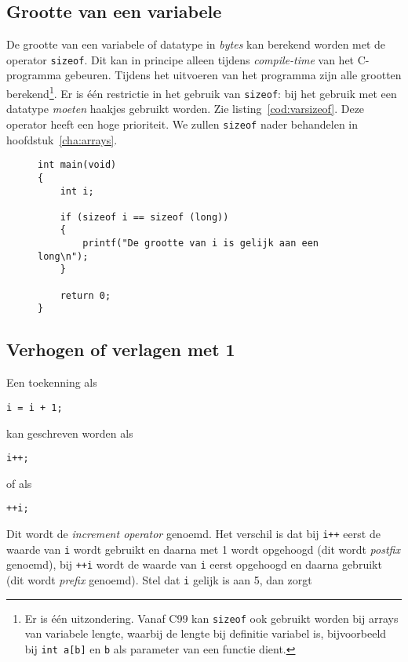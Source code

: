 \subsection{Grootte van een variabele}
De grootte van een variabele of datatype in \textsl{bytes} kan berekend worden met de operator \mbox{\texttt{sizeof}}. Dit kan in principe alleen tijdens \textsl{compile-time} van het C-programma gebeuren. Tijdens het uitvoeren van het programma zijn alle grootten berekend\footnote{Er is één uitzondering. Vanaf C99 kan \texttt{sizeof} ook gebruikt worden bij arrays van variabele lengte, waarbij de lengte bij definitie variabel is, bijvoorbeeld bij \texttt{int a[b]} en \texttt{b} als parameter van een functie dient.}. Er is één restrictie in het gebruik van \texttt{sizeof}: bij het gebruik met een datatype \textsl{moeten} haakjes gebruikt worden. Zie listing~\ref{cod:varsizeof}. Deze operator heeft een hoge prioriteit. We zullen \texttt{sizeof} nader behandelen in hoofdstuk~\ref{cha:arrays}.

\begin{figure}[!ht]
\begin{lstlisting}[caption=Gebruik van \texttt{sizeof}.,label=cod:varsizeof]
int main(void)
{
	int i;

    if (sizeof i == sizeof (long))
    {
        printf("De grootte van i is gelijk aan een long\n");
    }

    return 0;
}
\end{lstlisting}
\end{figure}

\subsection{Verhogen of verlagen met 1}
Een toekenning als

\hspace*{1em}\texttt{i = i + 1;}

kan geschreven worden als

\hspace*{1em}\texttt{i++;}

of als 

\hspace*{1em}\texttt{++i;}

Dit wordt de \textsl{increment operator}\indexop{++} genoemd. Het verschil is dat bij \texttt{i++} eerst de waarde van \texttt{i} wordt gebruikt en daarna met 1 wordt opgehoogd (dit wordt \textsl{postfix} genoemd), bij \texttt{++i} wordt de waarde van \texttt{i} eerst opgehoogd en daarna gebruikt (dit wordt \textsl{prefix} genoemd). Stel dat \texttt{i} gelijk is aan 5, dan zorgt

